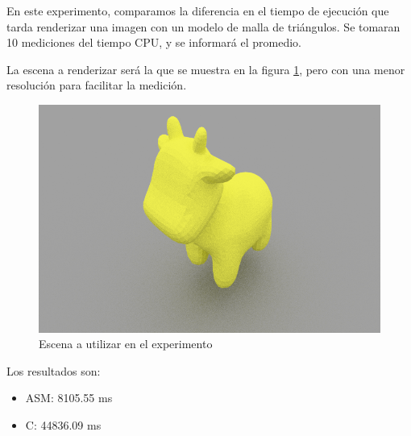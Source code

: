En este experimento, comparamos la diferencia en el tiempo de ejecución que
tarda renderizar una imagen con un modelo de malla de triángulos. Se tomaran 10
mediciones del tiempo CPU, y se informará el promedio.

La escena a renderizar será la que se muestra en la figura \ref{fig:exp4-scene},
pero con una menor resolución para facilitar la medición.

\begin{figure}
    \centering
    \includegraphics[width=.95\textwidth]{./imgs/exp4.png}
    \caption{Escena a utilizar en el experimento}
    \label{fig:exp4-scene}
\end{figure}

Los resultados son:

\begin{itemize}
    \item ASM: 8105.55 ms
    \item C: 44836.09 ms
\end{itemize}
